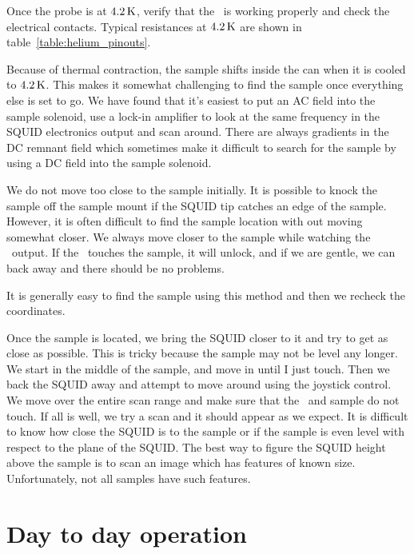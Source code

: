 Once the probe is at $4.2\,\kelvin$, 
verify that the \squid\ is working properly and check the electrical
contacts. Typical resistances at $4.2\,\kelvin$ are shown in 
table~\ref{table:helium_pinouts}.

Because of thermal contraction, the sample shifts inside the can
when it is cooled to $4.2\,\kelvin$. This makes it somewhat challenging to find
the sample once everything else is set to go. We have
found that it's easiest
to put an AC field into the sample solenoid, use a lock-in amplifier
to look at the same frequency in the SQUID electronics output
and scan around. There are always gradients in the 
DC remnant field which sometimes make it difficult to search for the sample by
using a DC field into the sample solenoid. 

\label{app:squid_sample_alignment}
We do not move too close to the sample initially. It is possible to knock
the sample off the sample mount if the SQUID tip catches 
an edge of the sample. 
However, it is often difficult to find the sample location with out 
moving somewhat closer. We always move closer to the
sample while watching the \squid\ output. If the \squid\ touches the 
sample, it will unlock, and if we are gentle, we can back away
and there should be no problems.

It is generally easy to find the sample using this method and then
we recheck the coordinates.

Once the sample is located, we bring the SQUID 
closer to it and try to get as close
as possible. This is tricky because the sample may not be level any 
longer. We start in the middle of the sample, and move in until I just
touch. Then we back the SQUID 
away and attempt to move around using the joystick
control. We move over the entire scan range and 
make sure that the \squid\ and sample do not touch. If all is well, 
we try a scan and it should appear as we expect. It is 
difficult to know
how close the SQUID is to the sample or if the sample is
even level with respect to the plane of the SQUID. The best way
to figure the SQUID height above the sample is to scan an image which
has features of known size. Unfortunately, not all samples have
such features.

\section{Day to day operation}


